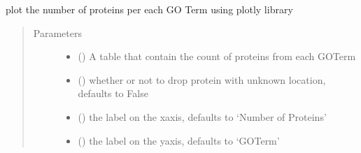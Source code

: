 \documentclass[letterpaper,10pt,english]{sphinxmanual}
\begin{document}
\begin{fulllineitems}
\label{\detokenize{IPTK.Visualization:IPTK.Visualization.vizTools.plotly_num_protein_per_go_term}}
plot the number of proteins per each GO Term using plotly library
\begin{quote}\begin{description}
\item[{Parameters}] \leavevmode\begin{itemize}
\item {} 
 () \textendash{} A table that contain the count of proteins from each GO\sphinxhyphen{}Term

\item {} 
 (\sphinxstyleliteralemphasis{\sphinxupquote{, }}) \textendash{} whether or not to drop protein with unknown location, defaults to False

\item {} 
 (\sphinxstyleliteralemphasis{\sphinxupquote{, }}) \textendash{} the label on the x\sphinxhyphen{}axis, defaults to ‘Number of Proteins’

\item {} 
 (\sphinxstyleliteralemphasis{\sphinxupquote{, }}) \textendash{} the label on the y\sphinxhyphen{}axis, defaults to ‘GO\sphinxhyphen{}Term’


\end{itemize}
\end{description}
\end{quote}
\end{fulllineitems}
\end{document}
